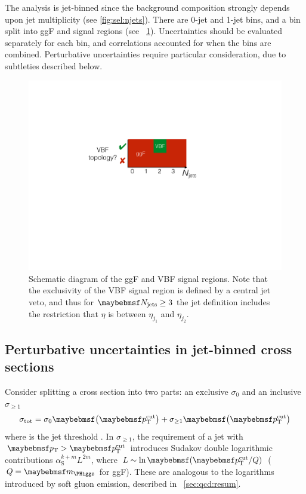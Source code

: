 
The analysis is jet-binned since the background composition strongly depends upon jet 
multiplicity (see \Figure\ref{fig:sel:njets}). There are 0-jet and 1-jet bins, and a 
\twojet bin split into \ac{ggF} and  signal regions (see 
\Figure~\ref{fig:sig:jetbinning}). Uncertainties should be evaluated separately for each 
bin, and correlations accounted for when the bins are combined. Perturbative 
uncertainties require particular consideration, due to subtleties described below.

\begin{figure}
	\includegraphics[width=\mediumfigwidth,clip=true,trim=8.5cm 13.1cm 12.1cm 8.4cm]{custom_images/signal_jetbin}
	\caption{Schematic diagram of the \ac{ggF} and \ac{VBF} signal regions. Note that the 
	exclusivity of the \ac{VBF} signal region is defined by a central jet veto, and thus 
	for $\njets \geq 3$ the jet definition includes the restriction that $\eta$ is 
	between $\eta_{j_1}$ and $\eta_{j_2}$.}
	\label{fig:sig:jetbinning}
\end{figure}



\subsection{Perturbative uncertainties in jet-binned cross sections}
\label{sec:ggF:naive}

Consider splitting a cross section into two parts: an exclusive $\sigma_0$ and an 
inclusive $\sigma_{\geq1}$
\begin{equation}
	\sigma_{\total} = \sigma_0 \parenths{\ptcut} + \sigma_{\geq1} \parenths{\ptcut}
\end{equation}
where \ptcut is the jet \pt threshold \cite{YR2}. In $\sigma_{\geq1}$, the requirement of 
a jet with $\pt > \ptcut$ introduces Sudakov double logarithmic contributions 
$\alpha_{\text{S}}^{k+m} L^{2m}$, where $L \sim \ln\parenths{\ptcut/Q}$ ($Q = \mH$ for 
\ac{ggF}). These are analogous to the logarithms introduced by soft gluon emission, 
described in \Section~\ref{sec:qcd:resum}. 

